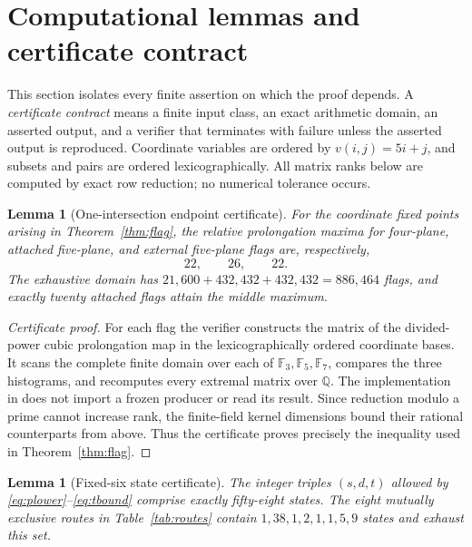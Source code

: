 \documentclass[11pt,reqno]{amsart}
\newtheorem{lemma}[theorem]{Lemma}
\theoremstyle{definition}
\newcommand{\Q}{\mathbb Q}
\newcommand{\F}{\mathbb F}
\begin{document}
\section{Computational lemmas and certificate contract}
\label{sec:certificates}

This section isolates every finite assertion on which the proof depends. A
\emph{certificate contract} means a finite input class, an exact arithmetic
domain, an asserted output, and a verifier that terminates with failure unless
the asserted output is reproduced. Coordinate variables are ordered by
\(v(i,j)=5i+j\), and subsets and pairs are ordered lexicographically. All
matrix ranks below are computed by exact row reduction; no numerical
tolerance occurs.

\begin{lemma}[One-intersection endpoint certificate]
\label{lem:certificate-one-intersection}
For the coordinate fixed points arising in Theorem~\ref{thm:flag}, the
relative prolongation maxima for four-plane, attached five-plane, and external
five-plane flags are, respectively,
\[
 22,\qquad 26,\qquad 22.
\]
The exhaustive domain has \(21{,}600+432{,}432+432{,}432=886{,}464\) flags,
and exactly twenty attached flags attain the middle maximum.
\end{lemma}

\begin{proof}[Certificate proof]
For each flag the verifier constructs the matrix of the divided-power cubic
prolongation map in the lexicographically ordered coordinate bases. It scans
the complete finite domain over each of \(\F_3,\F_5,\F_7\), compares the three
histograms, and recomputes every extremal matrix over \(\Q\). The implementation
in  does not
import a frozen producer or read its result. Since reduction modulo a prime
cannot increase rank, the finite-field kernel dimensions bound their rational
counterparts from above. Thus the certificate proves precisely the inequality
used in Theorem~\ref{thm:flag}.
\end{proof}

\begin{lemma}[Fixed-six state certificate]
\label{lem:certificate-fixed-six}
The integer triples \((s,d,t)\) allowed by
\eqref{eq:plower}--\eqref{eq:tbound} comprise exactly fifty-eight states. The
eight mutually exclusive routes in Table~\ref{tab:routes} contain
\(1,38,1,2,1,1,5,9\) states and exhaust this set.
\end{lemma}
\end{document}
